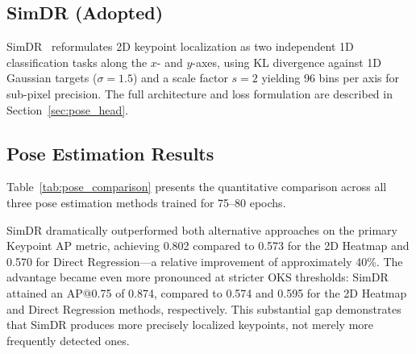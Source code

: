 \subsection{SimDR (Adopted)}
\label{sec:pose_simdr}

SimDR~\cite{li20212d} reformulates 2D keypoint localization as two independent 1D classification tasks along the $x$- and $y$-axes, using KL divergence against 1D Gaussian targets ($\sigma = 1.5$) and a scale factor $s = 2$ yielding 96 bins per axis for sub-pixel precision. The full architecture and loss formulation are described in Section~\ref{sec:pose_head}.

\subsection{Pose Estimation Results}
\label{sec:pose_results}

Table~\ref{tab:pose_comparison} presents the quantitative comparison across all three pose estimation methods trained for 75--80 epochs.

\begin{table}[t]
\centering
\caption{Comparison of pose estimation methods (Stage 1, 75--80 training epochs).}
\label{tab:pose_comparison}
\end{table}

SimDR dramatically outperformed both alternative approaches on the primary Keypoint AP metric, achieving 0.802 compared to 0.573 for the 2D Heatmap and 0.570 for Direct Regression---a relative improvement of approximately 40\%. The advantage became even more pronounced at stricter OKS thresholds: SimDR attained an AP@0.75 of 0.874, compared to 0.574 and 0.595 for the 2D Heatmap and Direct Regression methods, respectively. This substantial gap demonstrates that SimDR produces more precisely localized keypoints, not merely more frequently detected ones.

